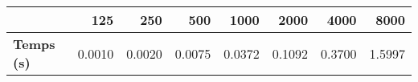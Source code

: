 \begin{tabular}{lrrrrrrr}
\toprule
{} &   125  &   250  &   500  &   1000 &   2000 &   4000 &   8000 \\
\midrule
\textbf{Temps (s)} & 0.0010 & 0.0020 & 0.0075 & 0.0372 & 0.1092 & 0.3700 & 1.5997 \\
\bottomrule
\end{tabular}
